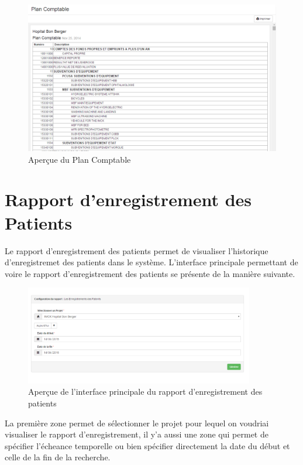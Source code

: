 \documentclass[12pt,a4paper]{report}
\begin{document}
\begin{figure}[h]
\begin{center}
\includegraphics[width=14cm]{pic/PlanComptableAf.png}
\end{center}
\caption{Aperçue du Plan Comptable}
\label{Aperçue du Plan Comptable}
\end{figure}

\newpage
\section{Rapport d'enregistrement des Patients}
Le rapport d'enregistrement des patients permet de visualiser l'historique d'enregistremet des patients dans le système. L'interface principale permettant de voire le rapport d'enregistrement des patients se présente de la manière suivante. 

\begin{figure}[h]
\begin{center}
\includegraphics[width=10cm]{pic/RapportEnrPatient.png}
\end{center}
\caption{Aperçue de l'interface principale du rapport d'enregistrement des patients}
\label{Aperçue de l'interface principale du rapport d'enregistrement des patients}
\end{figure}


La première zone permet de sélectionner le projet pour lequel on voudriai visualiser le rapport d'enregistrement, il y'a aussi une zone qui permet de spécifier l'écheance temporelle  ou bien spécifier directement la date du début et celle de la fin de la recherche. 
\end{document}
